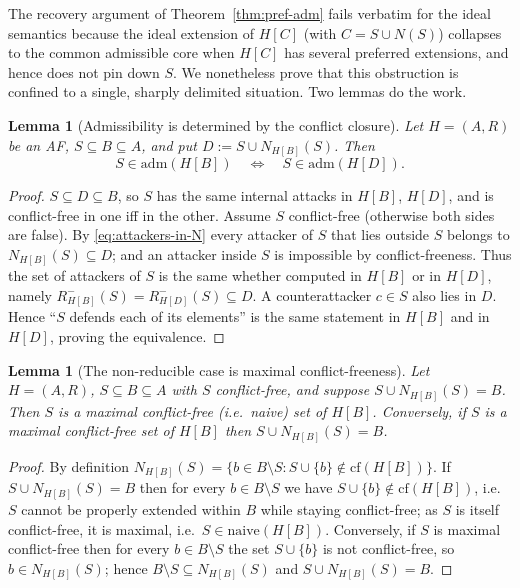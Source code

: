 \documentclass{amsart}
\newtheorem{lemma}[theorem]{Lemma}
\theoremstyle{remark}
\begin{document}
The recovery argument of Theorem~\ref{thm:pref-adm} fails verbatim for the ideal
semantics because the ideal extension of $H[C]$ (with $C=S\cup N(S)$) collapses
to the common admissible core when $H[C]$ has several preferred extensions, and
hence does not pin down $S$.  We nonetheless prove that this obstruction is
confined to a single, sharply delimited situation.  Two lemmas do the work.

\begin{lemma}[Admissibility is determined by the conflict closure]
\label{lem:conf-closure}
Let $H=(A,R)$ be an AF, $S\subseteq B\subseteq A$, and put
$D:=S\cup N_{H[B]}(S)$.  Then
\[
S\in\mathrm{adm}(H[B])\quad\Longleftrightarrow\quad S\in\mathrm{adm}(H[D]).
\]
\end{lemma}

\begin{proof}
$S\subseteq D\subseteq B$, so $S$ has the same internal attacks in $H[B]$,
$H[D]$, and is conflict-free in one iff in the other.  Assume $S$ conflict-free
(otherwise both sides are false).  By \eqref{eq:attackers-in-N} every attacker of
$S$ that lies outside $S$ belongs to $N_{H[B]}(S)\subseteq D$; and an attacker
inside $S$ is impossible by conflict-freeness.  Thus the set of attackers of $S$
is the same whether computed in $H[B]$ or in $H[D]$, namely
$R^-_{H[B]}(S)=R^-_{H[D]}(S)\subseteq D$.  A counterattacker $c\in S$ also lies in
$D$.  Hence ``$S$ defends each of its elements'' is the same statement in $H[B]$
and in $H[D]$, proving the equivalence.
\end{proof}

\begin{lemma}[The non-reducible case is maximal conflict-freeness]
\label{lem:maxcf}
Let $H=(A,R)$, $S\subseteq B\subseteq A$ with $S$ conflict-free, and suppose
$S\cup N_{H[B]}(S)=B$.  Then $S$ is a maximal conflict-free (i.e.\ naive) set of
$H[B]$.  Conversely, if $S$ is a maximal conflict-free set of $H[B]$ then
$S\cup N_{H[B]}(S)=B$.
\end{lemma}

\begin{proof}
By definition $N_{H[B]}(S)=\{b\in B\setminus S:S\cup\{b\}\notin\mathrm{cf}(H[B])\}$.
If $S\cup N_{H[B]}(S)=B$ then for every $b\in B\setminus S$ we have
$S\cup\{b\}\notin\mathrm{cf}(H[B])$, i.e.\ $S$ cannot be properly extended within
$B$ while staying conflict-free; as $S$ is itself conflict-free, it is maximal,
i.e.\ $S\in\mathrm{naive}(H[B])$.  Conversely, if $S$ is maximal conflict-free
then for every $b\in B\setminus S$ the set $S\cup\{b\}$ is not conflict-free, so
$b\in N_{H[B]}(S)$; hence $B\setminus S\subseteq N_{H[B]}(S)$ and
$S\cup N_{H[B]}(S)=B$.
\end{proof}
\end{document}
